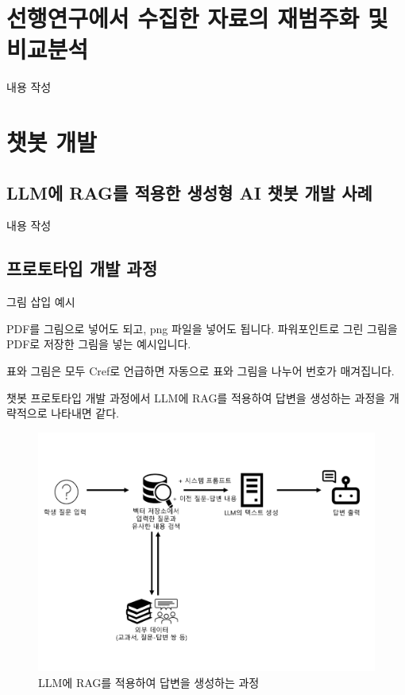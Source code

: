 \section{선행연구에서 수집한 자료의 재범주화 및 비교분석}

내용 작성

\section{챗봇 개발}

\subsection{LLM에 RAG를 적용한 생성형 AI 챗봇 개발 사례}

내용 작성

\subsection{프로토타입 개발 과정}

그림 삽입 예시

PDF를 그림으로 넣어도 되고, png 파일을 넣어도 됩니다. 파워포인트로 그린 그림을 PDF로 저장한 그림을 넣는 예시입니다.

표와 그림은 모두 Cref로 언급하면 자동으로 표와 그림을 나누어 번호가 매겨집니다.

챗봇 프로토타입 개발 과정에서 LLM에 RAG를 적용하여 답변을 생성하는 과정을 개략적으로 나타내면 \와 같다.

\begin{figure}[h!]
    \centering
    \includegraphics[width=12cm]{pdfs/method-RAG.pdf}
    \caption{LLM에 RAG를 적용하여 답변을 생성하는 과정}
    \label{method-RAG}
\end{figure}

